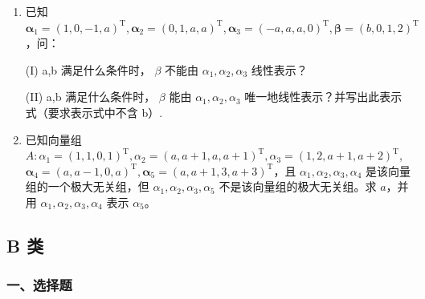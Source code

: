 \documentclass[12pt, a4paper]{ctexart}
\begin{document}
\begin{enumerate}[start=10]
    \item 已知 $ \boldsymbol{\alpha}_{1}=(1,0,-1,a)^{\mathrm{T}},\boldsymbol{\alpha}_{2}=(0,1,a,a)^{\mathrm{T}},\boldsymbol{\alpha}_{3}=(-a,a,a,0)^{\mathrm{T}},\boldsymbol{\beta}=(b,0,1,2)^{\mathrm{T}} $，问：
    
    (I) a,b 满足什么条件时， $ \beta $ 不能由 $ \alpha_{1},\alpha_{2},\alpha_{3} $ 线性表示？
    
    (II) a,b 满足什么条件时， $ \beta $ 能由 $ \alpha_{1},\alpha_{2},\alpha_{3} $ 唯一地线性表示？并写出此表示式（要求表示式中不含 b）.

    \item 已知向量组 $ A: \alpha_{1} = (1, 1, 0, 1)^{\mathrm{T}}, \alpha_{2} = (a, a + 1, a, a + 1)^{\mathrm{T}}, \alpha_{3} = (1, 2, a + 1, a + 2)^{\mathrm{T}} $, $ \boldsymbol{\alpha}_{4}=\left(a,a-1,0,a\right)^{\mathrm{T}},\boldsymbol{\alpha}_{5}=\left(a,a+1,3,a+3\right)^{\mathrm{T}} $，且 $ \alpha_{1},\alpha_{2},\alpha_{3},\alpha_{4} $ 是该向量组的一个极大无关组，但 $ \alpha_{1},\alpha_{2},\alpha_{3},\alpha_{5} $ 不是该向量组的极大无关组。求 $ a $，并用 $ \alpha_{1},\alpha_{2},\alpha_{3},\alpha_{4} $ 表示 $ \alpha_{5} $。
\end{enumerate}

\subsection{B 类}

\subsubsection*{一、选择题}
\end{document}
